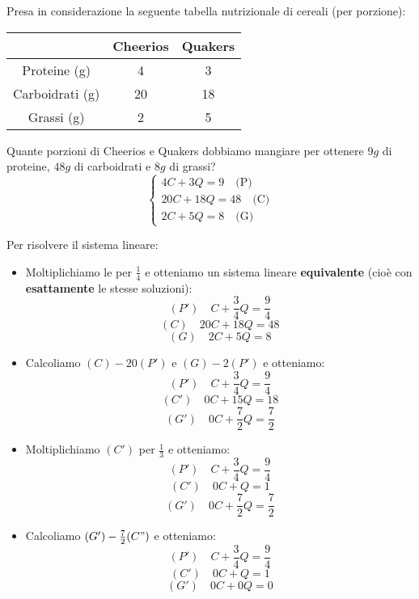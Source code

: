 \documentclass[a4paper]{article}
\theoremstyle{break}
\theoremstyle{break}
\theoremstyle{break}
\theoremstyle{break}
\begin{document}
\begin{example}
  Presa in considerazione la seguente tabella nutrizionale di cereali (per porzione):
  \begin{center}
    \begin{tabular}{c|c|c}
                      & Cheerios & Quakers \\
                      \hline
      Proteine (g)    & 4        & 3       \\
      Carboidrati (g) & 20       & 18      \\
      Grassi (g)      & 2        & 5       \\
    \end{tabular}
  \end{center}
  Quante porzioni di Cheerios e Quakers dobbiamo mangiare per ottenere \( 9g \) di
  proteine, \( 48g \) di carboidrati e \( 8g \) di grassi?
  \[
    \begin{cases}
      4C + 3Q = 9 \quad \text{(P)}    \\
      20C + 18Q = 48 \quad \text{(C)} \\
      2C + 5Q = 8 \quad \text{(G)}
    \end{cases}
  \]

  Per risolvere il sistema lineare:
  \begin{itemize}
    \item
      Moltiplichiamo le per \( \frac{1}{4} \)
      e otteniamo un sistema lineare \textbf{equivalente} (cioè con
      \textbf{esattamente} le stesse soluzioni):
      \[
        (P') \quad C + \frac{3}{4}Q = \frac{9}{4}
      \]
      \[
        (C) \quad 20C + 18Q = 48
      \]
      \[
        (G) \quad 2C + 5Q = 8
      \]
    \item Calcoliamo \( (C)-20(P') \) e \( (G)-2(P') \) e otteniamo:
      \[
        (P') \quad C + \frac{3}{4}Q = \frac{9}{4}
      \]
      \[
        (C') \quad 0C + 15Q = 18
      \]
      \[
        (G') \quad 0C + \frac{7}{2}Q = \frac{7}{2}
      \]
    \item Moltiplichiamo \( (C') \) per \( \frac{1}{3} \) e otteniamo:
      \[
        (P') \quad C + \frac{3}{4}Q = \frac{9}{4}
      \]
      \[
        (C') \quad 0C + Q = 1
      \]
      \[
        (G') \quad 0C + \frac{7}{2}Q = \frac{7}{2}
      \]
    \item Calcoliamo \( (G') - \frac{7}{2} (C") \) e otteniamo:
      \[
        (P') \quad C + \frac{3}{4}Q = \frac{9}{4}
      \]
      \[
        (C') \quad 0C + Q = 1
      \]
      \[
        (G') \quad 0C + 0Q = 0
      \]
  \end{itemize}


\end{example}
\end{document}
